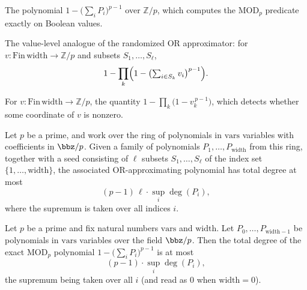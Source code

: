 \begin{definition}
\label{RazborovSmolensky.exactMod}
\leanok
The polynomial $1 - \bigl(\sum_i P_i\bigr)^{p-1}$ over $\mathbb{Z}/p$, which computes the
$\mathrm{MOD}_p$ predicate exactly on Boolean values.
\end{definition}

\begin{definition}
\label{RazborovSmolensky.approxOr_val}
\leanok
The value-level analogue of the randomized OR approximator: for $v : \mathrm{Fin}\,
\mathrm{width} \to \mathbb{Z}/p$ and subsets $S_1,\dots,S_\ell$,
\[
1 - \prod_{k}\Bigl(1 - \bigl(\textstyle\sum_{i \in S_k} v_i\bigr)^{p-1}\Bigr).
\]
\end{definition}

\begin{definition}
\label{RazborovSmolensky.OR_val}
\leanok
For $v : \mathrm{Fin}\,\mathrm{width} \to \mathbb{Z}/p$, the quantity
$1 - \prod_{k}\bigl(1 - v_k^{\,p-1}\bigr)$, which detects whether some coordinate of $v$ is
nonzero.
\end{definition}

\begin{theorem}
\label{RazborovSmolensky.approxOr_totalDegree}
\leanok
{}
Let $p$ be a prime, and work over the ring of polynomials in $\mathrm{vars}$ variables
with coefficients in $\bbz/p$. Given a family of polynomials
$P_1,\dots,P_{\mathrm{width}}$ from this ring, together with a seed consisting of $\ell$
subsets $S_1,\dots,S_\ell$ of the index set $\{1,\dots,\mathrm{width}\}$, the associated
OR-approximating polynomial has total degree at most
\[
(p-1)\,\ell\cdot \sup_i \deg(P_i),
\]
where the supremum is taken over all indices $i$.
\end{theorem}

\begin{theorem}
\label{RazborovSmolensky.exactMod_totalDegree}
\leanok
{}
Let $p$ be a prime and fix natural numbers $\mathrm{vars}$ and $\mathrm{width}$. Let
$P_0,\dots,P_{\mathrm{width}-1}$ be polynomials in $\mathrm{vars}$ variables over the
field $\bbz/p$. Then the total degree of the exact $\mathrm{MOD}_p$ polynomial $1 -
\bigl(\sum_i P_i\bigr)^{p-1}$ is at most
\[
(p-1)\cdot \sup_i \deg(P_i),
\]
the supremum being taken over all $i$ (and read as $0$ when $\mathrm{width}=0$).
\end{theorem}

